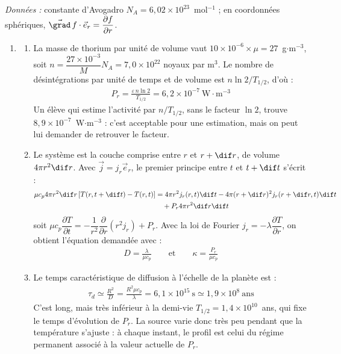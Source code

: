 \textit{Données :} constante d'Avogadro $N_A=6{,}02\times10^{23}$~mol$^{-1}$ ; en coordonnées sphériques, $\vec{\grad}\,f\cdot \vec{e}_r = \dfrac{\partial f}{\partial r}$.

\newpage

\begin{correction}

\begin{enumerate}

\item

\begin{enumerate}

	\item La masse de thorium par unité de volume vaut $10\times10^{-6}\times\mu=27$~g$\cdot$m$^{-3}$, soit $n=\dfrac{27\times10^{-3}}{M}N_A=7{,}0\times10^{22}$ noyaux par m$^3$. Le nombre de désintégrations par unité de temps et de volume est $n\ln2/T_{1/2}$, d'où :
	\begin{align*}
		P_r=\frac{\varepsilon\, n\ln2}{T_{1/2}}=6{,}2\times10^{-7}~\text{W}\cdot\text{m}^{-3}
	\end{align*}
	Un élève qui estime l'activité par $n/T_{1/2}$, sans le facteur $\ln 2$, trouve $8{,}9\times10^{-7}$~W$\cdot$m$^{-3}$ : c'est acceptable pour une estimation, mais on peut lui demander de retrouver le facteur.

	\item Le système est la couche comprise entre $r$ et $r+\dif r$, de volume $4\pi r^2\dif r$. Avec $\vec{j}=j_r\vec{e}_r$, le premier principe entre $t$ et $t+\dif t$ s'écrit :
	\begin{align*}
		\mu c_p4\pi r^2\dif r\left[T(r,t+\dif t)-T(r,t)\right]&=4\pi r^2j_r(r,t)\dif t-4\pi(r+\dif r)^2j_r(r+\dif r,t)\dif t \\
		&\quad+P_r4\pi r^2\dif r\dif t
	\end{align*}
	soit $\mu c_p\dfrac{\partial T}{\partial t}=-\dfrac{1}{r^2}\dfrac{\partial}{\partial r}\left(r^2j_r\right)+P_r$. Avec la loi de Fourier $j_r=-\lambda\dfrac{\partial T}{\partial r}$, on obtient l'équation demandée avec :
	\begin{align*}
		\boxed{D=\frac{\lambda}{\mu c_p}} \qquad\text{et}\qquad \boxed{\kappa=\frac{P_r}{\mu c_p}}
	\end{align*}

	\item Le temps caractéristique de diffusion à l'échelle de la planète est :
	\begin{align*}
		\tau_d\simeq\frac{R^2}{D}=\frac{R^2\mu c_p}{\lambda}=6{,}1\times10^{15}~\text{s}\simeq1{,}9\times10^{8}~\text{ans}
	\end{align*}
	C'est long, mais très inférieur à la demi-vie $T_{1/2}=1{,}4\times10^{10}$~ans, qui fixe le temps d'évolution de $P_r$. La source varie donc très peu pendant que la température s'ajuste : à chaque instant, le profil est celui du régime permanent associé à la valeur actuelle de $P_r$.


\end{enumerate}
\end{enumerate}
\end{correction}
